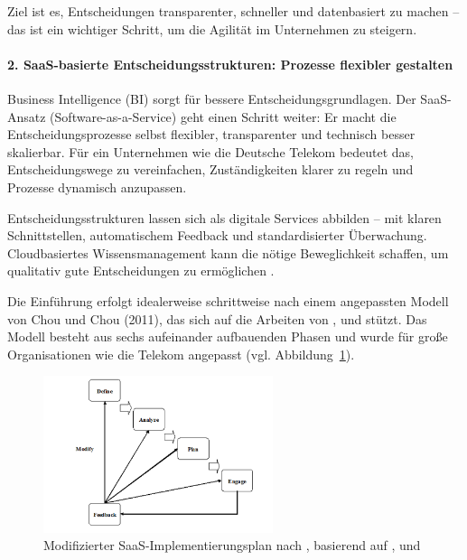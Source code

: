 \documentclass[12pt,a4paper]{article}
\begin{document}
	\noindent Ziel ist es, Entscheidungen transparenter, schneller und datenbasiert zu machen – das ist ein wichtiger Schritt, um die Agilität im Unternehmen zu steigern.
	
	\paragraph{2. SaaS-basierte Entscheidungsstrukturen: Prozesse flexibler gestalten}
	
	Business Intelligence (BI) sorgt für bessere Entscheidungsgrundlagen. Der SaaS-Ansatz (Software-as-a-Service) geht einen Schritt weiter: Er macht die Entscheidungsprozesse selbst flexibler, transparenter und technisch besser skalierbar. Für ein Unternehmen wie die Deutsche Telekom bedeutet das, Entscheidungswege zu vereinfachen, Zuständigkeiten klarer zu regeln und Prozesse dynamisch anzupassen.
	
	\noindent Entscheidungsstrukturen lassen sich als digitale Services abbilden – mit klaren Schnittstellen, automatischem Feedback und standardisierter Überwachung. Cloudbasiertes Wissensmanagement kann die nötige Beweglichkeit schaffen, um qualitativ gute Entscheidungen zu ermöglichen \parencite{churakova2010software}.
	
	\noindent Die Einführung erfolgt idealerweise schrittweise nach einem angepassten Modell von Chou und Chou (2011), das sich auf die Arbeiten von \parencite{murthy2010tapping}, \parencite{chong2006multi} und \parencite{buyya2008market} stützt. Das Modell besteht aus sechs aufeinander aufbauenden Phasen und wurde für große Organisationen wie die Telekom angepasst (vgl. Abbildung~\ref{fig:saas-implementation-plan}).
	
	\begin{figure}[H]
		\centering
		\includegraphics[width=0.6\textwidth]{./images/saas_implementation_plan.png}
		\caption{Modifizierter SaaS-Implementierungsplan nach \textcite{chou2011cloud}, basierend auf \textcite{murthy2010tapping}, \textcite{chong2006multi} und \textcite{buyya2008market}}
		\label{fig:saas-implementation-plan}
	\end{figure}
	
\end{document}
